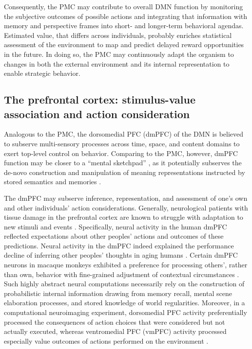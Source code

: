\documentclass[10pt,letterpaper]{article}
\begin{document}
Consequently, the PMC may contribute to overall DMN function
by monitoring the subjective outcomes
of possible actions and integrating that information
with memory and perspective frames
into short- and longer-term behavioral agendas.
Estimated value, that differs across individuals, probably enriches
statistical assessment of the environment
to map and predict delayed reward opportunities in the future.
In doing so, the PMC may continuously adapt the organism to changes
in both the external environment and its internal representation
to enable strategic behavior.


\subsection{The prefrontal cortex: stimulus-value association and action consideration}
Analogous to the PMC,
the dorsomedial PFC (dmPFC) of the DMN is believed to subserve
multi-sensory processes
across time, space, and content domains to
exert top-level control on behavior.
Comparing to the PMC, however,
dmPFC function may be closer to a
``mental sketchpad'' \citep{goldman1996prefrontal}, as it
potentially subserves the de-novo construction and manipulation
of meaning representations instructed by stored semantics and memories
\citep{bzdok2013segregation}.



The dmPFC may subserve inference, representation, and assessment
of one's own and other individuals' action considerations.
Generally,
neurological patients with tissue damage in the prefrontal cortex
are known to struggle with
adaptation to new stimuli and events
\citep{stuss1986frontal}.
Specifically, neural activity in the human dmPFC
reflected expectations about other peoples' actions and
outcomes of these predictions.
Neural activity in the dmPFC indeed explained the performance decline
of inferring other peoples' thoughts in aging humans \citep{moran2012social}.
Certain dmPFC neurons in macaque monkeys exhibited a preference
for processing others', rather than own, behavior
with fine-grained adjustment of contextual circumstances \citep{yoshida2010neural}.
%
Such highly abstract neural computations necessarily rely on the
construction of probabilistic internal information drawing from
memory recall, mental scene elaboration processes,
and stored knowledge of world regularities.
%
Moreover,
in a computational neuroimaging experiment,
dorsomedial PFC activity preferentially processed the consequences of
action choices that were considered but not actually executed,
whereas ventromedial PFC (vmPFC) activity
processed especially value outcomes of actions performed on the environment
\citep{nicolle2012agent}.
\end{document}
